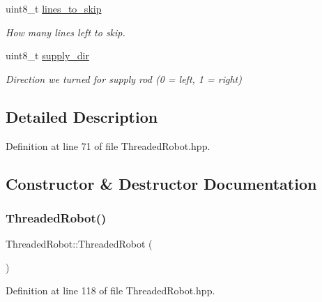 \begin{DoxyCompactItemize}
uint8\+\_\+t \hyperlink{class_threaded_robot_aacd340e703b54f0d3568c6c2bed974bf}{lines\+\_\+to\+\_\+skip}
\begin{DoxyCompactList}\small\item\em How many lines left to skip. \end{DoxyCompactList}\item 
uint8\+\_\+t \hyperlink{class_threaded_robot_aa895dd29f7418754d4dfb8555572ae31}{supply\+\_\+dir}
\begin{DoxyCompactList}\small\item\em Direction we turned for supply rod (0 = left, 1 = right) \end{DoxyCompactList}\end{DoxyCompactItemize}


\subsection{Detailed Description}


Definition at line 71 of file Threaded\+Robot.\+hpp.



\subsection{Constructor \& Destructor Documentation}
\mbox{\label{class_threaded_robot_a4516decdf3303ded4e77fcb2b61b0c5a}} 
\subsubsection{\texorpdfstring{Threaded\+Robot()}{ThreadedRobot()}}
{\footnotesize\ttfamily Threaded\+Robot\+::\+Threaded\+Robot (\begin{DoxyParamCaption}{ }\end{DoxyParamCaption})\hspace{0.3cm}{\ttfamily [inline]}}



Definition at line 118 of file Threaded\+Robot.\+hpp.


